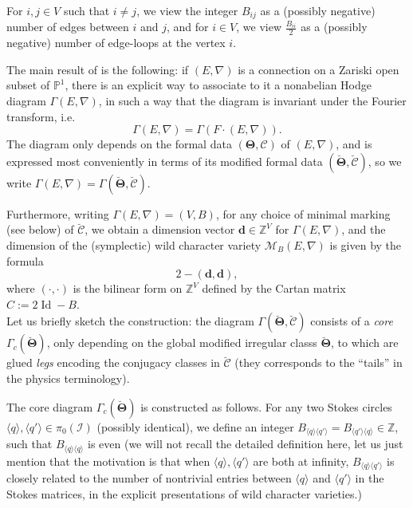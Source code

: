 \documentclass[11pt,a4paper]{amsart}
\numberwithin{equation}{section}
\DeclareMathOperator{\Id}{Id}
\newcommand{\cir}[1]{\langle #1 \rangle}
\begin{document}
For $i, j\in V$ such that $i\neq j$, we view the integer $B_{ij}$ as a (possibly negative) number of edges between $i$ and $j$, and for $i\in V$, we view $\frac{B_{ii}}{2}$ as a (possibly negative) number of edge-loops at the vertex $i$.

The main result of \cite{doucot2021diagrams} is the following: if $(E,\nabla)$ is a connection on a Zariski open subset of $\mathbb P^1$, there is an explicit way to associate to it a nonabelian Hodge diagram $\Gamma(E, \nabla)$, in such a way that the diagram is invariant under the Fourier transform, i.e.
\[
\Gamma(E,\nabla)=\Gamma(F\cdot (E,\nabla)).
\]
The diagram only depends on the formal data $(\bm\Theta, \bm{\mathcal C})$ of $(E,\nabla)$, and is expressed most conveniently in terms of its modified formal data $(\bm{\breve\Theta}, \bm{\breve{\mathcal C}})$, so we write $\Gamma(E,\nabla)=\Gamma(\bm{\breve\Theta}, \bm{\breve{\mathcal C}})$. 

Furthermore, writing $\Gamma(E,\nabla)=(V,B)$,  for any choice of minimal marking (see below) of $\bm{\breve{\mathcal C}}$, we obtain a dimension vector $\mathbf d\in \mathbb Z^V$ for $\Gamma(E,\nabla)$, and the dimension of the (symplectic) wild character variety $\mathcal M_B(E,\nabla)$ is given by the formula
\[
2-(\mathbf d, \mathbf d),
\]
where $(\cdot, \cdot)$ is the bilinear form on $\mathbb Z^V$ defined by the Cartan matrix $C:=2\Id-B$.\\

Let us briefly sketch the construction: the diagram $\Gamma(\bm{\breve\Theta}, \bm{\breve{\mathcal C}})$ consists of a \emph{core} $\Gamma_c(\bm{\breve\Theta})$, only depending on the global modified irregular classs $\bm{\breve\Theta}$, to which are glued  \emph{legs} encoding the conjugacy classes in $\bm{\breve{\mathcal C}}$ (they corresponds to the ``tails'' in the physics terminology).

The core diagram $\Gamma_c(\bm{\breve\Theta})$ is constructed as follows. For any two Stokes circles $\cir{q}, \cir{q'}\in \pi_0(\mathcal I)$ (possibly identical), we define an integer $B_{\cir{q}\cir{q'}}=B_{\cir{q'}\cir{q}}\in \mathbb Z$, such that $B_{\cir{q}\cir{q}}$ is even (we will not recall the detailed definition here, let us just mention that the motivation is that when $\cir{q}, \cir{q'}$ are both at infinity, $B_{\cir{q}\cir{q'}}$ is closely related to the number of nontrivial entries between $\cir{q}$ and $\cir{q'}$ in the Stokes matrices, in the explicit presentations of wild character varieties.)
\end{document}

